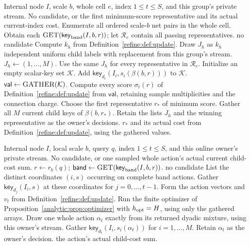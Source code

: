 \documentclass[11pt]{article}
\newcommand{\wedkey}[2]{\mathsf{key}_{#1}(#2)}
\newenvironment{wedalgorithm}[2]{%
  \begin{algorithm}[!htbp]%
  \caption{#1}\label{#2}%
  \small\begin{algorithmic}[1]%
}{%
  \end{algorithmic}\end{algorithm}%
}
\theoremstyle{definition}
\newcommand{\1}{\mathbf 1}
\begin{document}
\begin{wedalgorithm}{One whole-cell group choice}{alg:group}
\Require Internal node $I$, scale $b$, whole cell $e$, index $1\le t\le S$, and this group's private stream.
\Ensure No candidate, or the first minimum-score representative and its actual current-index cost.
  \State Enumerate all ordered scale-$b$ net pairs in the whole cell.
  \State Obtain each $\Call{GET}{\wedkey{\mathrm{band}}{I,b,r}}$; let $\mathcal R_e$ contain all passing representatives.
   \State \Return no candidate \EndIf
    \State Compute $k_h$ from Definition~\ref{refine:def:update}.
      \State Draw $J_h$ as $k_h$ independent uniform child labels with replacement from this group's stream.
    \Else
      \State $J_h\gets(1,\ldots,M)$.
    \EndIf
    \State Use the same $J_h$ for every representative in $\mathcal R_e$.
  \EndFor
  \State Initialize an empty scalar-key set $\mathcal K$.
      \State Add $\wedkey{d_t}{I_i,s_i(\beta(b,r))}$ to $\mathcal K$.
    \EndIf
  \EndFor
  \State $\mathsf{val}\gets\Call{GATHER}{\mathcal K}$.
  \State Compute every score $\sigma_t(r)$ of Definition~\ref{refine:def:update} from $\mathsf{val}$, retaining sample multiplicities and the connection charge.
  \State Choose the first representative $r_*$ of minimum score.
  \State Gather all $M$ current child keys of $\beta(b,r_*)$.
  \State Retain the lists $J_h$ and the winning representative as the owner's decisions.
  \State \Return $r_*$ and its actual cost from Definition~\ref{refine:def:update}, using the gathered values.
\EndProcedure
\end{wedalgorithm}

\begin{wedalgorithm}{An online action from earlier child indices}{alg:online}
\Require Internal node $I$, local scale $b$, query $q$, index $1\le t\le S$, and this online owner's private stream.
\Ensure No candidate, or one sampled whole action's actual current child-cost sum.
  \State $r\gets r_b(q)$; $\mathsf{band}\gets\Call{GET}{\wedkey{\mathrm{band}}{I,b,r}}$.
   \State \Return no candidate \EndIf
  \State List the distinct coordinates $(i,s)$ occurring on complete band actions.
  \State Gather $\wedkey{d_j}{I_i,s}$ at these coordinates for $j=0,\ldots,t-1$.
  \State Form the action vectors and $v_t$ from Definition~\ref{refine:def:update}.
  \State Run the finite optimizer of Proposition~\ref{analytic:prop:optimizer} with $h_{\rm opt}=H$, using only the gathered arrays.
  \State Draw one whole action $\alpha_t$ exactly from its returned dyadic mixture, using this owner's stream.
  \State Gather $\wedkey{d_t}{I_i,s_i(\alpha_t)}$ for $i=1,\ldots,M$.
  \State Retain $\alpha_t$ as the owner's decision.
  \State \Return the action's actual child-cost sum.
\EndProcedure
\end{wedalgorithm}
\end{document}
